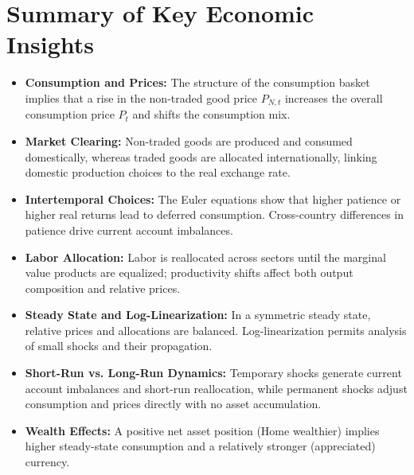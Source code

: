 \documentclass[a4paper,12pt]{article} %
\theoremstyle{nonitalic}
\begin{document}
\section{Summary of Key Economic Insights}
\begin{itemize}
    \item \textbf{Consumption and Prices:} The structure of the consumption basket implies that a rise in the non‐traded good price \( P_{N,t} \) increases the overall consumption price \( P_t \) and shifts the consumption mix.
    \item \textbf{Market Clearing:} Non-traded goods are produced and consumed domestically, whereas traded goods are allocated internationally, linking domestic production choices to the real exchange rate.
    \item \textbf{Intertemporal Choices:} The Euler equations show that higher patience or higher real returns lead to deferred consumption. Cross-country differences in patience drive current account imbalances.
    \item \textbf{Labor Allocation:} Labor is reallocated across sectors until the marginal value products are equalized; productivity shifts affect both output composition and relative prices.
    \item \textbf{Steady State and Log-Linearization:} In a symmetric steady state, relative prices and allocations are balanced. Log-linearization permits analysis of small shocks and their propagation.
    \item \textbf{Short-Run vs. Long-Run Dynamics:} Temporary shocks generate current account imbalances and short-run reallocation, while permanent shocks adjust consumption and prices directly with no asset accumulation.
    \item \textbf{Wealth Effects:} A positive net asset position (Home wealthier) implies higher steady-state consumption and a relatively stronger (appreciated) currency.
\end{itemize}
\end{document}
